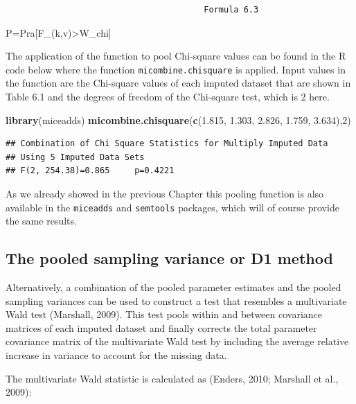 \documentclass[]{book}
\newenvironment{Shaded}{\begin{snugshade}}{\end{snugshade}}
\newcommand{\KeywordTok}[1]{\textcolor[rgb]{0.13,0.29,0.53}{\textbf{#1}}}
\newcommand{\DecValTok}[1]{\textcolor[rgb]{0.00,0.00,0.81}{#1}}
\newcommand{\FloatTok}[1]{\textcolor[rgb]{0.00,0.00,0.81}{#1}}
\newcommand{\NormalTok}[1]{#1}
\theoremstyle{definition}
\theoremstyle{definition}
\theoremstyle{definition}
\theoremstyle{remark}
\begin{document}
\begin{verbatim}
                                        Formula 6.3
\end{verbatim}

P=Pra{[}F\_(k,v)\textgreater{}W\_chi{]}

The application of the function to pool Chi-square values can be found
in the R code below where the function \texttt{micombine.chisquare} is
applied. Input values in the function are the Chi-square values of each
imputed dataset that are shown in Table 6.1 and the degrees of freedom
of the Chi-square test, which is 2 here.

\begin{Shaded}
\begin{Highlighting}[]
\KeywordTok{library}\NormalTok{(miceadds)}
\KeywordTok{micombine.chisquare}\NormalTok{(}\KeywordTok{c}\NormalTok{(}\FloatTok{1.815}\NormalTok{,}
            \FloatTok{1.303}\NormalTok{,}
            \FloatTok{2.826}\NormalTok{,}
            \FloatTok{1.759}\NormalTok{,}
            \FloatTok{3.634}\NormalTok{),}\DecValTok{2}\NormalTok{)}
\end{Highlighting}
\end{Shaded}

\begin{verbatim}
## Combination of Chi Square Statistics for Multiply Imputed Data
## Using 5 Imputed Data Sets
## F(2, 254.38)=0.865     p=0.4221
\end{verbatim}

As we already showed in the previous Chapter this pooling function is
also available in the \texttt{miceadds} and \texttt{semtools} packages,
which will of course provide the same results.

\subsection{The pooled sampling variance or D1
method}\label{the-pooled-sampling-variance-or-d1-method}

Alternatively, a combination of the pooled parameter estimates and the
pooled sampling variances can be used to construct a test that resembles
a multivariate Wald test (Marshall, 2009). This test pools within and
between covariance matrices of each imputed dataset and finally corrects
the total parameter covariance matrix of the multivariate Wald test by
including the average relative increase in variance to account for the
missing data.

The multivariate Wald statistic is calculated as (Enders, 2010; Marshall
et al., 2009):
\end{document}
